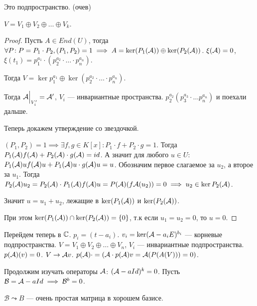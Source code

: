 \begin{remark}
    Это подпространство. (очев)
\end{remark}

\begin{theorem}
    $V = V_1 \oplus V_2 \oplus \ldots \oplus V_k$.
\end{theorem}
\begin{proof}
    Пусть $A \in End(U)$, тогда $\forall P\!: P = P_1 \cdot P_2, (P_1, P_2) = 1 \implies A = \ker(P_1(\mathcal{A})) \oplus \ker(P_2(\mathcal{A}))$. $\xi(\mathcal{A}) = 0$, $\xi(t_1) = p_1^{a_1} \cdot (p_2^{a_2} \cdot \ldots \cdot p_n^{a_n})$. 

    Тогда $V = \ker p_1^{a_1} \oplus \ker(p_2^{a_2} \cdot \ldots \cdot p_n^{a_n})$. 

    Тогда $\mathcal{A}\Big|_{V'_i} = \mathcal{A}'$,  $V_i$ --- инвариантные пространства.  $p_2^{a_2} (p_3^{a_3} \cdot \ldots p_n^{a_n})$ и поехали дальше.

    Теперь докажем утверждение со звездочкой.

    $(P_1, P_2) = 1 \implies \exists f, g \in K[x]\!: P_1 \cdot f + P_2 \cdot g = 1$. Тогда $P_1(\mathcal{A}) f(\mathcal{A}) + P_2(\mathcal{A})\cdot g(\mathcal{A}) = id$. А значит для любого $u \in U\!:$  $P_1(\mathcal{A})u f(\mathcal{A})u + P_1(\mathcal{A})u \cdot g(\mathcal{A})u = u$. Обозначим первое слагаемое за $u_2$, а второе за $u_1$. Тогда $P_2(\mathcal{A}) u_2 = P_2(\mathcal{A}) \cdot P_1(\mathcal{A}) f(\mathcal{A})u = P(\mathcal{A})(f \mathcal{A}(u_2)) = 0 \implies u_2 \in \ker P_2(\mathcal{A})$. 

    Значит $u = u_1 + u_2$, лежащие в $\ker(P_1(\mathcal{A}))$ и $\ker(P_2(\mathcal{A}))$.

    При этом $\ker(P_1(\mathcal{A})) \cap \ker(P_2(\mathcal{A})) = \{0\}$, т.к если $u_1=u_2=0$, то $u=0$.
\end{proof}

Перейдем теперь в $\mathbb{C}$.  $p_i = (t-a_i)$.  $v_i = \ker(\mathcal{A} - a_iE)^{b_i}$ --- корневые подпространства. $V = V_1 \oplus V_2 \oplus \ldots \oplus V_n$, $V_i$ --- инвариантные подпространства.  $p(\mathcal{A})(v) = 0$.  $V \to \mathcal{A} v$.  $p(\mathcal{A}) \cdot = (\mathcal{A} \cdot p(\mathcal{A})v = \mathcal{A}(P(A(V))) = 0)$. 

Продолжим изучать операторы $\mathcal{A}$: $(\mathcal{A} - aId)^k = 0$. Пусть  $\mathcal{B} = \mathcal{A} - aId \implies \mathcal{B}^b = 0$.

$\mathcal{B} \leadsto B$ --- очень простая матрица в хорошем базисе. 

